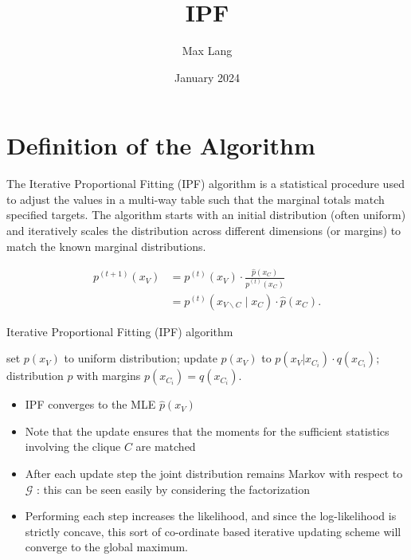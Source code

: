 \documentclass{article}
\title{IPF}
\author{Max Lang}
\date{January 2024}
\begin{document}
\maketitle

\section{Definition of the Algorithm}

The Iterative Proportional Fitting (IPF) algorithm is a statistical procedure used to adjust the values in a multi-way table such that the marginal totals match specified targets. The algorithm starts with an initial distribution (often uniform) and iteratively scales the distribution across different dimensions (or margins) to match the known marginal distributions.

$$
\begin{aligned}
p^{(t+1)}\left(x_V\right) & =p^{(t)}\left(x_V\right) \cdot \frac{\hat{p}\left(x_C\right)}{p^{(t)}\left(x_C\right)} \\
& =p^{(t)}\left(x_{V \backslash C} \mid x_C\right) \cdot \hat{p}\left(x_C\right) .
\end{aligned}
$$

\begin{algorithm}
\caption{Iterative Proportional Fitting (IPF) algorithm}
\begin{algorithmic}[1]
    \State set $p(x_V)$ to uniform distribution;
            \State update $p(x_V)$ to $p(x_V | x_{C_i}) \cdot q(x_{C_i});$
        \EndFor
    \EndWhile
    \State \Return distribution $p$ with margins $p(x_{C_i}) = q(x_{C_i})$.
\EndFunction
\end{algorithmic}
\end{algorithm}

\begin{itemize}
    \item IPF converges to the MLE $\hat{p}\left(x_V\right)$
    \item Note that the update ensures that the moments for the sufficient statistics involving the clique $C$ are matched
    \item After each update step the joint distribution remains Markov with respect to $\mathcal{G}$ : this can be seen easily by considering the factorization
    \item Performing each step increases the likelihood, and since the log-likelihood is strictly concave, this sort of co-ordinate based iterative updating scheme will converge to the global maximum.
\end{itemize}
\end{document}
